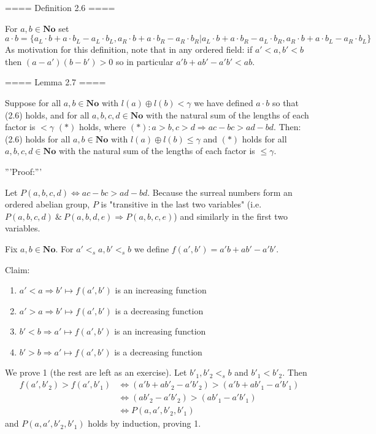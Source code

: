 ==== Definition 2.6 ====

For $a,b\in \mathbf{No}$ set
\[
a\cdot b = \{a_L\cdot b + a\cdot b_L - a_L\cdot b_L, a_R\cdot b + a\cdot b_R - a_R\cdot b_R | a_L\cdot b + a\cdot b_R - a_L\cdot b_R, a_R\cdot b + a\cdot b_L - a_R\cdot b_L \}
\]
As motivation for this definition, note that in any ordered field: if $a'<a,b'<b$ then $(a-a')(b-b')>0$ so in particular $a'b + ab' - a'b' < ab$.

==== Lemma 2.7 ====

Suppose for all $a,b\in \mathbf{No}$ with $l(a)\oplus l(b) < \gamma$ we have defined $a\cdot b$ so that (2.6) holds, and for all $a,b,c,d\in \mathbf{No}$ with the natural sum of the lengths of each factor is $<\gamma$ $(*)$ holds, where
$(*): a>b, c>d \Rightarrow ac-bc > ad-bd.$
Then: (2.6) holds for all $a,b\in \mathbf{No}$ with $l(a)\oplus l(b) \leq \gamma$ and $(*)$ holds for all $a,b,c,d\in \mathbf{No}$ with the natural sum of the lengths of each factor is $\leq \gamma$.

'''Proof:'''

Let $P(a,b,c,d)\Leftrightarrow ac - bc > ad - bd.$ Because the surreal numbers form an ordered abelian group, $P$ is  "transitive in the last two variables" (i.e. $P(a,b,c,d) \ \&\ P(a,b,d,e) \Rightarrow P(a,b,c,e)$) and similarly in the first two variables.

Fix $a,b\in \mathbf{No}$. For $a' <_s a, b' <_s b$ we define $f(a',b') = a'b + ab' - a'b'$.

Claim:
\begin{enumerate}
	\item  $a' < a \Rightarrow b' \mapsto f(a',b')$ is an increasing function
	\item  $a' > a \Rightarrow b' \mapsto f(a',b')$ is a decreasing function
	\item  $b' < b \Rightarrow a' \mapsto f(a',b')$ is an increasing function
	\item  $b' > b \Rightarrow a' \mapsto f(a',b')$ is a decreasing function
\end{enumerate}

We prove 1 (the rest are left as an exercise). Let $b'_1,b'_2 <_s b$ and $b'_1 < b'_2$. Then
\begin{align*}
f(a',b'_2) > f(a',b'_1) &\Leftrightarrow (a'b + ab'_2 - a'b'_2) > (a'b + ab'_1 - a'b'_1)  \\
&\Leftrightarrow (ab'_2 - a'b'_2) > (ab'_1 - a'b'_1) \\
&\Leftrightarrow P(a,a',b'_2,b'_1)
\end{align*}
and $P(a,a',b'_2,b'_1)$ holds by induction, proving 1.


